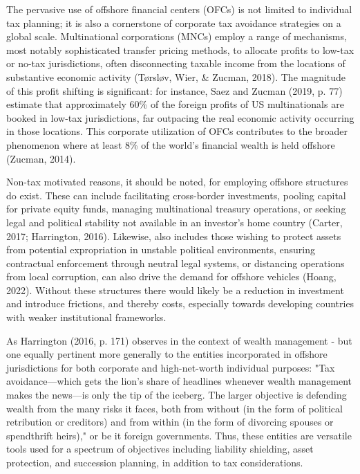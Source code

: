 The pervasive use of offshore financial centers (OFCs) is not limited to individual tax planning; it is also a cornerstone of corporate tax avoidance strategies on a global scale. Multinational corporations (MNCs) employ a range of mechanisms, most notably sophisticated transfer pricing methods, to allocate profits to low-tax or no-tax jurisdictions, often disconnecting taxable income from the locations of substantive economic activity (Tørsløv, Wier, \& Zucman, 2018). The magnitude of this profit shifting is significant: for instance, Saez and Zucman (2019, p. 77) estimate that approximately 60\% of the foreign profits of US multinationals are booked in low-tax jurisdictions, far outpacing the real economic activity occurring in those locations. This corporate utilization of OFCs contributes to the broader phenomenon where at least 8\% of the world's financial wealth is held offshore (Zucman, 2014).

Non-tax motivated reasons, it should be noted, for employing offshore structures do exist. These can include facilitating cross-border investments, pooling capital for private equity funds, managing multinational treasury operations, or seeking legal and political stability not available in an investor's home country (Carter, 2017; Harrington, 2016). Likewise, also includes those wishing to protect assets from potential expropriation in unstable political environments, ensuring contractual enforcement through neutral legal systems, or distancing operations from local corruption, can also drive the demand for offshore vehicles (Hoang, 2022). Without these structures there would likely be a reduction in investment and introduce frictions, and thereby costs, especially towards developing countries with weaker institutional frameworks.

As Harrington (2016, p. 171) observes in the context of wealth management - but one equally pertinent more generally to the entities incorporated in offshore jurisdictions for both corporate and high-net-worth individual purposes: "Tax avoidance—which gets the lion’s share of headlines whenever wealth management makes the news—is only the tip of the iceberg. The larger objective is defending wealth from the many risks it faces, both from without (in the form of political retribution or creditors) and from within (in the form of divorcing spouses or spendthrift heirs)," or be it foreign governments. Thus, these entities are versatile tools used for a spectrum of objectives including liability shielding, asset protection, and succession planning, in addition to tax considerations.


